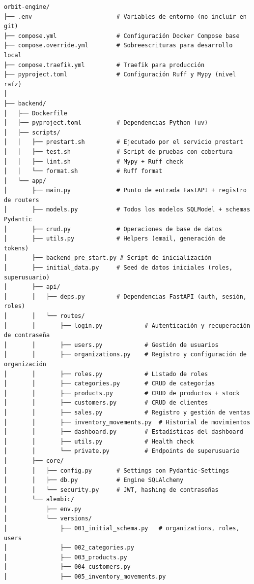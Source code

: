 \begin{verbatim}
orbit-engine/
├── .env                        # Variables de entorno (no incluir en git)
├── compose.yml                 # Configuración Docker Compose base
├── compose.override.yml        # Sobreescrituras para desarrollo local
├── compose.traefik.yml         # Traefik para producción
├── pyproject.toml              # Configuración Ruff y Mypy (nivel raíz)
│
├── backend/
│   ├── Dockerfile
│   ├── pyproject.toml          # Dependencias Python (uv)
│   ├── scripts/
│   │   ├── prestart.sh         # Ejecutado por el servicio prestart
│   │   ├── test.sh             # Script de pruebas con cobertura
│   │   ├── lint.sh             # Mypy + Ruff check
│   │   └── format.sh           # Ruff format
│   └── app/
│       ├── main.py             # Punto de entrada FastAPI + registro de routers
│       ├── models.py           # Todos los modelos SQLModel + schemas Pydantic
│       ├── crud.py             # Operaciones de base de datos
│       ├── utils.py            # Helpers (email, generación de tokens)
│       ├── backend_pre_start.py # Script de inicialización
│       ├── initial_data.py     # Seed de datos iniciales (roles, superusuario)
│       ├── api/
│       │   ├── deps.py         # Dependencias FastAPI (auth, sesión, roles)
│       │   └── routes/
│       │       ├── login.py            # Autenticación y recuperación de contraseña
│       │       ├── users.py            # Gestión de usuarios
│       │       ├── organizations.py    # Registro y configuración de organización
│       │       ├── roles.py            # Listado de roles
│       │       ├── categories.py       # CRUD de categorías
│       │       ├── products.py         # CRUD de productos + stock
│       │       ├── customers.py        # CRUD de clientes
│       │       ├── sales.py            # Registro y gestión de ventas
│       │       ├── inventory_movements.py  # Historial de movimientos
│       │       ├── dashboard.py        # Estadísticas del dashboard
│       │       ├── utils.py            # Health check
│       │       └── private.py          # Endpoints de superusuario
│       ├── core/
│       │   ├── config.py       # Settings con Pydantic-Settings
│       │   ├── db.py           # Engine SQLAlchemy
│       │   └── security.py     # JWT, hashing de contraseñas
│       └── alembic/
│           ├── env.py
│           └── versions/
│               ├── 001_initial_schema.py   # organizations, roles, users
│               ├── 002_categories.py
│               ├── 003_products.py
│               ├── 004_customers.py
│               ├── 005_inventory_movements.py

\end{verbatim}

